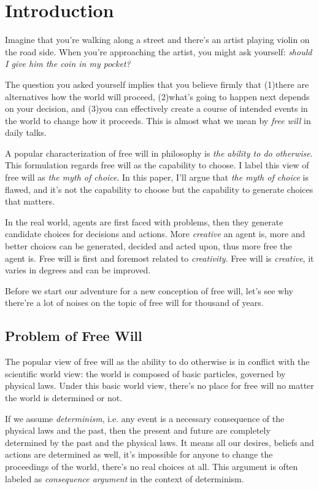 \section{Introduction}

Imagine that you're walking along a street and there's an artist playing violin on the road side. When you're approaching the artist, you might ask yourself: \emph{should I give him the coin in my pocket?}

The question you asked yourself implies that you believe firmly that (1)there are alternatives how the world will proceed, (2)what's going to happen next depends on your decision, and (3)you can effectively create a course of intended events in the world to change how it proceeds. This is almost what we mean by \emph{free will} in daily talks.

A popular characterization of free will in philosophy is \emph{the ability to do otherwise}\cite{sep-freewill}. This formulation regards free will as the capability to choose. I label this view of free will as \emph{the myth of choice}. In this paper, I'll argue that \emph{the myth of choice} is flawed, and it's not the capability to choose but the capability to generate choices that matters.

In the real world, agents are first faced with problems, then they generate candidate choices for decisions and actions. More \emph{creative} an agent is, more and better choices can be generated, decided and acted upon, thus more free the agent is. Free will is first and foremost related to \emph{creativity}. Free will is \emph{creative}, it varies in degrees and can be improved.

Before we start our adventure for a new conception of free will, let's see why there're a lot of noises on the topic of free will for thousand of years.

\subsection{Problem of Free Will}

The popular view of free will as the ability to do otherwise is in conflict with the scientific world view: the world is composed of basic particles, governed by physical laws. Under this basic world view, there’s no place for free will no matter the world is determined or not.

If we assume \emph{determinism}, i.e. any event is a necessary consequence of the physical laws and the past, then the present and future are completely determined by the past and the physical laws. It means all our desires, beliefs and actions are determined as well, it’s impossible for anyone to change the proceedings of the world, there’s no real choices at all. This argument is often labeled as \emph{consequence argument} in the context of determinism.

